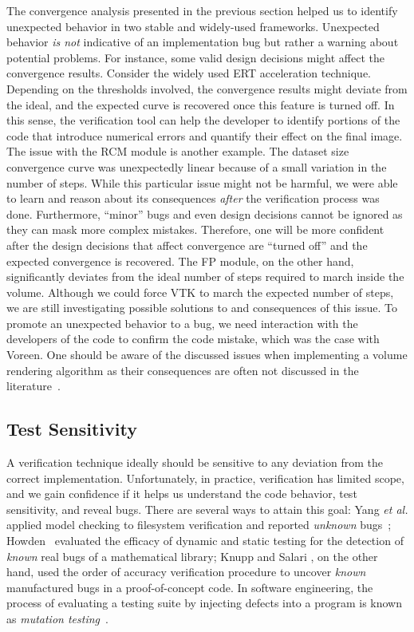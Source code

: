The convergence analysis presented in the previous section helped us
to identify unexpected behavior in two stable and widely-used
frameworks. Unexpected behavior \emph{is not} indicative of an
implementation bug but rather a warning about potential problems. For
instance, some valid design decisions might affect the convergence
results. Consider the widely used ERT acceleration
technique. Depending on the thresholds involved, the convergence
results might deviate from the ideal, and the expected curve is
recovered once this feature is turned off. In this sense, the
verification tool can help the developer to identify portions of the
code that introduce numerical errors and quantify their effect on the
final image. The issue with the RCM module is another example. The
dataset size convergence curve was unexpectedly linear because of a
small variation in the number of steps. While this particular issue
might not be harmful, we were able to learn and reason about its
consequences \emph{after} the verification process was
done. Furthermore, ``minor'' bugs and even design decisions cannot be
ignored as they can mask more complex mistakes. Therefore, one will be
more confident after the design decisions that affect convergence are
``turned off'' and the expected convergence is recovered.  The FP
module, on the other hand, significantly deviates from the ideal
number of steps required to march inside the volume. Although we could
force VTK to march the expected number of steps, we are still
investigating possible solutions to and consequences of this issue.
To promote an unexpected behavior to a bug, we need interaction with
the developers of the code to confirm the code mistake, which was the
case with Voreen.  One should be aware of the discussed issues when
implementing a volume rendering algorithm as their consequences are
often not discussed in the
literature~\cite{Real-TimeVolumeGraphics06}.

\subsection{Test Sensitivity}
\label{sec:test-sesitivity}

A verification technique ideally should be sensitive to any deviation
from the correct implementation. Unfortunately, in practice,
verification has limited scope, and we gain confidence if it helps us
understand the code behavior, test sensitivity, and reveal bugs. There
are several ways to attain this goal: Yang \emph{et al.} applied model
checking to filesystem verification and reported \emph{unknown}
bugs~\cite{Yang:2006:UMC:1189256.1189259};
Howden~\cite{Howden:1980:ASV:357103.357107} evaluated the efficacy of
dynamic and static testing for the detection of \emph{known} real bugs
of a mathematical library; Knupp and Salari \cite{KnuppSalari02}, on
the other hand, used the order of accuracy verification procedure to
uncover \emph{known} manufactured bugs in a proof-of-concept code.  In
software engineering, the process of evaluating a testing suite by
injecting defects into a program is known as \emph{mutation
  testing}~\cite{Riley:2009:BTL:1667105}.

